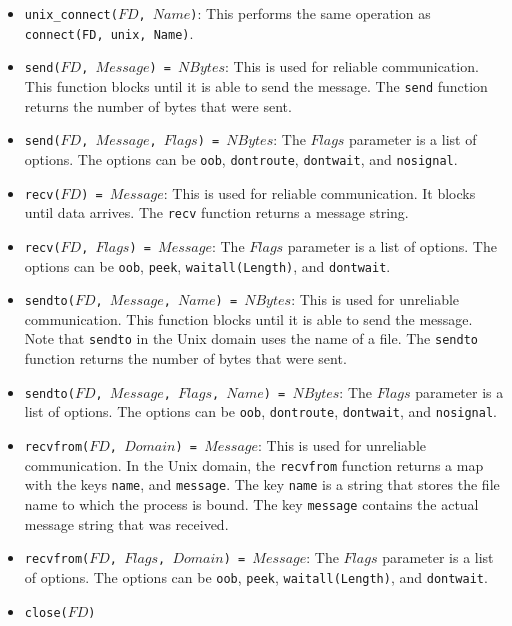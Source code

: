 \begin{itemize}
\item \texttt{unix\_connect($FD$, $Name$)}: This performs the same operation as \texttt{connect(FD, unix, Name)}.
\item \texttt{send($FD$, $Message$) = $NBytes$}: This is used for reliable communication.  This function blocks until it is able to send the message.  The \texttt{send} function returns the number of bytes that were sent.
\item \texttt{send($FD$, $Message$, $Flags$) = $NBytes$}: The $Flags$ parameter is a list of options. The options can be \texttt{oob}, \texttt{dontroute}, \texttt{dontwait}, and \texttt{nosignal}.
\item \texttt{recv($FD$) = $Message$}: This is used for reliable communication.  It blocks until data arrives.  The \texttt{recv} function returns a message string.  
\item \texttt{recv($FD$, $Flags$) = $Message$}:  The $Flags$ parameter is a list of options.   The options can be \texttt{oob}, \texttt{peek}, \texttt{waitall(Length)}, and \texttt{dontwait}.
\item \texttt{sendto($FD$, $Message$, $Name$) = $NBytes$}: This is used for unreliable communication.  This function blocks until it is able to send the message.  Note that \texttt{sendto} in the Unix domain uses the name of a file.  The \texttt{sendto} function returns the number of bytes that were sent.  
\item \texttt{sendto($FD$, $Message$, $Flags$, $Name$) = $NBytes$}: The $Flags$ parameter is a list of options. The options can be \texttt{oob}, \texttt{dontroute}, \texttt{dontwait}, and \texttt{nosignal}.
\item \texttt{recvfrom($FD$, $Domain$) = $Message$}: This is used for unreliable communication.  In the Unix domain, the \texttt{recvfrom} function returns a map with the keys \texttt{name}, and \texttt{message}.  The key \texttt{name} is a string that stores the file name to which the process is bound.  The key \texttt{message} contains the actual message string that was received.  
\item \texttt{recvfrom($FD$, $Flags$, $Domain$) = $Message$}:  The $Flags$ parameter is a list of options.  The options can be \texttt{oob}, \texttt{peek}, \texttt{waitall(Length)}, and \texttt{dontwait}.
\item \texttt{close($FD$)}
\end{itemize}

